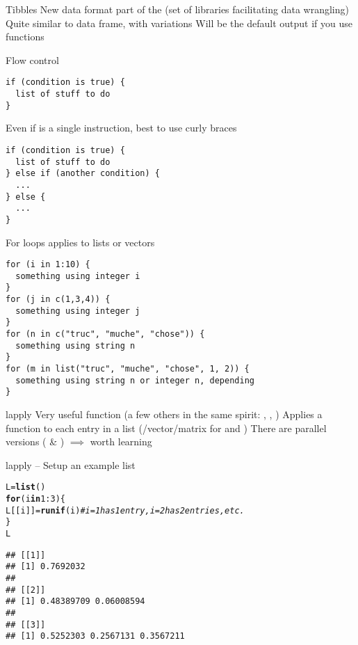 \documentclass[aspectratio=169]{beamer}\usepackage[]{graphicx}\usepackage[]{xcolor}
\makeatletter
\newcommand{\hlnum}[1]{\textcolor[rgb]{0.686,0.059,0.569}{#1}}%
\newcommand{\hlcom}[1]{\textcolor[rgb]{0.678,0.584,0.686}{\textit{#1}}}%
\newcommand{\hlopt}[1]{\textcolor[rgb]{0,0,0}{#1}}%
\newcommand{\hldef}[1]{\textcolor[rgb]{0.345,0.345,0.345}{#1}}%
\newcommand{\hlkwa}[1]{\textcolor[rgb]{0.161,0.373,0.58}{\textbf{#1}}}%
\newcommand{\hlkwb}[1]{\textcolor[rgb]{0.69,0.353,0.396}{#1}}%
\newcommand{\hlkwd}[1]{\textcolor[rgb]{0.737,0.353,0.396}{\textbf{#1}}}%
\newenvironment{kframe}{%
 \def\at@end@of@kframe{}%
 \ifinner\ifhmode%
  \def\at@end@of@kframe{\end{minipage}}%
  \begin{minipage}{\columnwidth}%
 \fi\fi%
 \def\FrameCommand##1{\hskip\@totalleftmargin \hskip-\fboxsep
 \colorbox{shadecolor}{##1}\hskip-\fboxsep
     \hskip-\linewidth \hskip-\@totalleftmargin \hskip\columnwidth}%
 \MakeFramed {\advance\hsize-\width
   \@totalleftmargin\z@ \linewidth\hsize
   \@setminipage}}%
 {\par\unskip\endMakeFramed%
 \at@end@of@kframe}
\newenvironment{knitrout}{}{} %
\makeatother
\begin{document}
\begin{frame}{Tibbles}
\bbullet
New data format part of the  (set of libraries facilitating data wrangling)
\vfill
\bbullet
Quite similar to data frame, with variations
\vfill
\bbullet Will be the default output if you use  functions
\end{frame}


\begin{frame}[fragile]{Flow control}
\begin{lstlisting}
if (condition is true) {
  list of stuff to do
}
\end{lstlisting}
Even if  is a single instruction, best to use curly braces
\begin{lstlisting}
if (condition is true) {
  list of stuff to do
} else if (another condition) {
  ...
} else {
  ...
}
\end{lstlisting}
\end{frame} 

\begin{frame}[fragile]{For loops}
 applies to lists or vectors
\begin{lstlisting}
for (i in 1:10) {
  something using integer i
}
for (j in c(1,3,4)) {
  something using integer j
}
for (n in c("truc", "muche", "chose")) {
  something using string n
}
for (m in list("truc", "muche", "chose", 1, 2)) {
  something using string n or integer n, depending
}
\end{lstlisting}
\end{frame} 

\begin{frame}[fragile]{lapply}
Very useful function (a few others in the same spirit: , , )
\vfill
Applies a function to each entry in a list (/vector/matrix for  and )
\vfill
There are parallel versions ( \& ) $\implies$ worth learning
\end{frame}

\begin{frame}[fragile]{lapply -- Setup an example list}
\begin{knitrout}
\color{fgcolor}\begin{kframe}
\begin{alltt}
\hldef{L} \hlkwb{=} \hlkwd{list}\hldef{()}
\hlkwa{for} \hldef{(i} \hlkwa{in} \hlnum{1}\hlopt{:}\hlnum{3}\hldef{) \{}
        \hldef{L[[i]]} \hlkwb{=} \hlkwd{runif}\hldef{(i)} \hlcom{# i=1 has 1 entry, i=2 has 2 entries, etc.}
\hldef{\}}
\hldef{L}
\end{alltt}
\begin{verbatim}
## [[1]]
## [1] 0.7692032
## 
## [[2]]
## [1] 0.48389709 0.06008594
## 
## [[3]]
## [1] 0.5252303 0.2567131 0.3567211
\end{verbatim}
\end{kframe}
\end{knitrout}
\end{frame}
\end{document}

